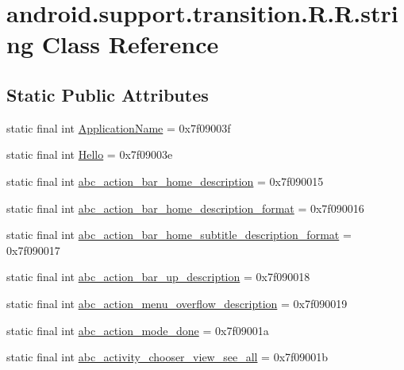 \hypertarget{classandroid_1_1support_1_1transition_1_1_r_1_1string}{
\section{android.support.transition.R.R.string Class Reference}
\label{classandroid_1_1support_1_1transition_1_1_r_1_1string}
}
\subsection*{Static Public Attributes}
\begin{CompactItemize}
\item 
static final int \hyperlink{classandroid_1_1support_1_1transition_1_1_r_1_1string_3bd680a67a677f5663d9d39f82ec3f7b}{ApplicationName} = 0x7f09003f
\item 
static final int \hyperlink{classandroid_1_1support_1_1transition_1_1_r_1_1string_0025a321b8200e162b029eb623d2fe97}{Hello} = 0x7f09003e
\item 
static final int \hyperlink{classandroid_1_1support_1_1transition_1_1_r_1_1string_c8f8c7d5483fb8949515edafb7f744b5}{abc\_\-action\_\-bar\_\-home\_\-description} = 0x7f090015
\item 
static final int \hyperlink{classandroid_1_1support_1_1transition_1_1_r_1_1string_5eaefe805cefc84c1f51e0611b9e5347}{abc\_\-action\_\-bar\_\-home\_\-description\_\-format} = 0x7f090016
\item 
static final int \hyperlink{classandroid_1_1support_1_1transition_1_1_r_1_1string_97a0656d838c055fd8d3a9706f1ee521}{abc\_\-action\_\-bar\_\-home\_\-subtitle\_\-description\_\-format} = 0x7f090017
\item 
static final int \hyperlink{classandroid_1_1support_1_1transition_1_1_r_1_1string_4a18e7f2205899e367ae74418169f274}{abc\_\-action\_\-bar\_\-up\_\-description} = 0x7f090018
\item 
static final int \hyperlink{classandroid_1_1support_1_1transition_1_1_r_1_1string_22cd673f7337ed25275af5335a1f07f4}{abc\_\-action\_\-menu\_\-overflow\_\-description} = 0x7f090019
\item 
static final int \hyperlink{classandroid_1_1support_1_1transition_1_1_r_1_1string_702bd80437dc95ba5ee76bb34643257f}{abc\_\-action\_\-mode\_\-done} = 0x7f09001a
\item 
static final int \hyperlink{classandroid_1_1support_1_1transition_1_1_r_1_1string_a19769f2851dcfc683335257439bc78e}{abc\_\-activity\_\-chooser\_\-view\_\-see\_\-all} = 0x7f09001b

\end{CompactItemize}
